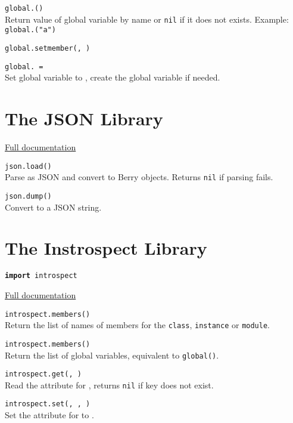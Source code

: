 \hangpar \texttt{global.(}\texttt{)} \\
Return value of global variable  by name or \texttt{nil} if it does not exists. Example: \texttt{global.("a")}

\hangpar \texttt{global.setmember(}\texttt{, }\texttt{)}

\hangpar \texttt{global.}\texttt{ = } \\
Set global variable  to , create the global variable if needed.

\section*{The JSON Library}

\hangpar \href{https://github.com/berry-lang/berry/wiki/Chapter-7\#json-module}{Full documentation}

\hangpar \texttt{json.load(}\texttt{)} \\
Parse  as JSON and convert to Berry objects. Returns \texttt{nil} if parsing fails.

\hangpar \texttt{json.dump(}\texttt{)} \\
Convert  to a JSON string.

\section*{The Instrospect Library}

\hangpar \texttt{\textbf{import} introspect}

\hangpar \href{https://github.com/berry-lang/berry/wiki/Chapter-7\#module-introspect}{Full documentation}

\hangpar \texttt{introspect.members(}\texttt{)} \\
Return the list of names of members for the \texttt{class}, \texttt{instance} or \texttt{module}.

\hangpar \texttt{introspect.members()} \\
Return the list of global variables, equivalent to \texttt{global()}.

\hangpar \texttt{introspect.get(}\texttt{, }\texttt{)} \\
Read the attribute  for , returns \texttt{nil} if key does not exist.

\hangpar \texttt{introspect.set(}\texttt{, }\texttt{, }\texttt{)} \\
Set the attribute  for  to .

